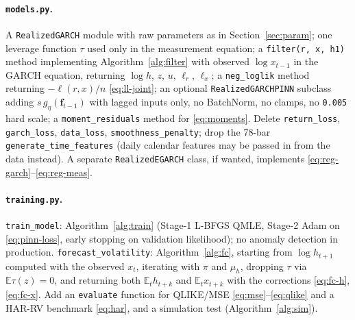 \documentclass[11pt]{article}
\newcommand{\E}{\mathbb{E}}
\begin{document}
\paragraph{\texttt{models.py}.} A \texttt{RealizedGARCH} module with raw parameters as in
Section~\ref{sec:param}; one leverage function $\tau$ used only in the measurement
equation; a \texttt{filter(r, x, h1)} method implementing Algorithm~\ref{alg:filter} with
observed $\log x_{t-1}$ in the GARCH equation, returning $\log h$, $z$, $u$, $\ell_r$, $\ell_x$;
a \texttt{neg\_loglik} method returning $-\ell(r,x)/n$ \eqref{eq:ll-joint}; an optional
\texttt{RealizedGARCHPINN} subclass adding $s\,g_\eta(\mathbf f_{t-1})$ with lagged inputs only,
no BatchNorm, no clamps, no \texttt{0.005} hard scale; a \texttt{moment\_residuals} method for
\eqref{eq:moments}. Delete \texttt{return\_loss}, \texttt{garch\_loss}, \texttt{data\_loss},
\texttt{smoothness\_penalty}; drop the 78-bar \texttt{generate\_time\_features}
(daily calendar features may be passed in from the data instead). A separate
\texttt{RealizedEGARCH} class, if wanted, implements
\eqref{eq:reg-garch}--\eqref{eq:reg-meas}.

\paragraph{\texttt{training.py}.} \texttt{train\_model}: Algorithm~\ref{alg:train}
(Stage-1 L-BFGS QMLE, Stage-2 Adam on \eqref{eq:pinn-loss}, early stopping on validation
likelihood); no anomaly detection in production. \texttt{forecast\_volatility}:
Algorithm~\ref{alg:fc}, starting from $\log h_{t+1}$ computed with the observed $x_t$, iterating
with $\pi$ and $\mu_h$, dropping $\tau$ via $\E\tau(z)=0$, and returning both
$\E_t h_{t+k}$ and $\E_t x_{t+k}$ with the corrections \eqref{eq:fc-h}, \eqref{eq:fc-x}.
Add an \texttt{evaluate} function for QLIKE/MSE \eqref{eq:mse}--\eqref{eq:qlike} and a HAR-RV
benchmark \eqref{eq:har}, and a simulation test (Algorithm~\ref{alg:sim}).
\end{document}
